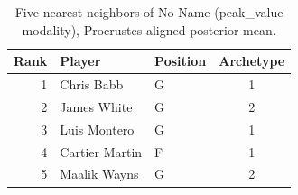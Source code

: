 \begin{table}[htbp]
  \centering\small
  \begin{tabular}{rllc}
    \toprule
    Rank & Player & Position & Archetype \\
    \midrule
    1 & Chris Babb & G & 1 \\
    2 & James White & G & 2 \\
    3 & Luis Montero & G & 1 \\
    4 & Cartier Martin & F & 1 \\
    5 & Maalik Wayns & G & 2 \\
    \bottomrule
  \end{tabular}
  \caption{Five nearest neighbors of No Name (peak_value modality), Procrustes-aligned posterior mean.}
  \label{tab:No_Name_neighbors_peak_value}
\end{table}

